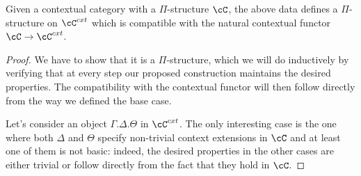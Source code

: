 \begin{prop}
  Given a contextual category with a $\Pi$-structure $\cC$, the above data
  defines a $\Pi$-structure on $\cC^{cxt}$ which is compatible with the natural
  contextual functor $\cC\rightarrow\cC^{cxt}$.
\end{prop}
\begin{proof}
  We have to
  show that it is a $\Pi$-structure, which we will do inductively by verifying
  that at every step our proposed construction maintains the desired properties.
  The compatibility with the contextual functor will then follow directly from
  the way we defined the base case.

  Let's consider an object $\Gamma.\Delta.\Theta$ in $\cC^{cxt}$. The only
  interesting case is the one where both $\Delta$ and $\Theta$
  specify non-trivial context extensions in $\cC$ and at least one of them is
  not basic: indeed, the desired properties in the other cases are either
  trivial or follow directly from the fact that they hold in $\cC$.


\end{proof}
